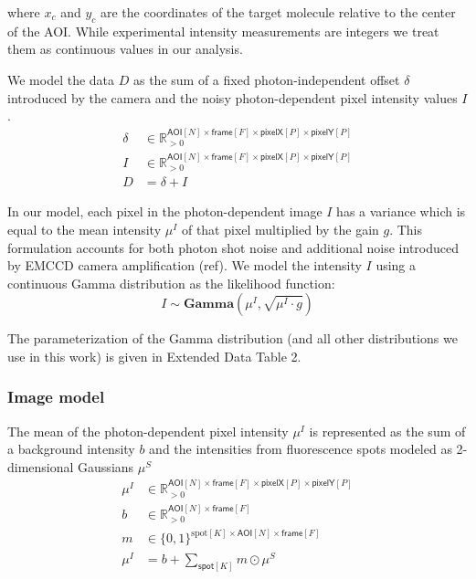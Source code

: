 \noindent
where $x_c$ and $y_c$ are the coordinates of the target molecule relative to the center of the AOI. While experimental intensity measurements are integers we treat them as continuous values in our analysis.

We model the data $D$ as the sum of a fixed photon-independent offset $\delta$ introduced by the camera and the noisy photon-dependent pixel intensity values $I$.
%
\begin{subequations}
\begin{align}
    \delta &\in \mathbb{R}_{>0}^{\mathsf{AOI}[N] \times \mathsf{frame}[F] \times \mathsf{pixelX}[P] \times \mathsf{pixelY}[P]} \\
    I &\in \mathbb{R}_{>0}^{\mathsf{AOI}[N] \times \mathsf{frame}[F] \times \mathsf{pixelX}[P] \times \mathsf{pixelY}[P]} \\ 
    D &= \delta + I
\end{align}
\end{subequations}

In our model, each pixel in the photon-dependent image $I$ has a  variance which is equal to  the mean intensity $\mu^I$ of that pixel multiplied by the gain $g$. This formulation accounts for both photon shot noise and additional noise introduced by EMCCD camera amplification (ref). We model the intensity $I$ using a continuous Gamma distribution as the likelihood function:
%
\begin{equation}
    I \sim \mathbf{Gamma} (\mu^I, \sqrt{\mu^I \cdot g})
\end{equation}

The parameterization of the Gamma distribution (and all other distributions we use in this work) is given in Extended Data Table 2.

\subsubsection*{Image model}

The mean of the photon-dependent pixel intensity $\mu^I$ is represented  as the sum of a background intensity $b$ and the intensities from fluorescence spots modeled as  2-dimensional Gaussians $\mu^S$ 
%
\begin{subequations}
\begin{align}
    \mu^I &\in \mathbb{R}_{>0}^{\mathsf{AOI}[N] \times \mathsf{frame}[F] \times \mathsf{pixelX}[P] \times \mathsf{pixelY}[P]} \\
    b &\in \mathbb{R}_{>0}^{\mathsf{AOI}[N] \times \mathsf{frame}[F]} \\
    m &\in \{ 0, 1 \}^{\mathrm{spot}[K] \times \mathsf{AOI}[N] \times \mathsf{frame}[F] } \\
    \mu^I &= b + \sum_{\mathsf{spot}[K]} m \odot{} \mu^S
\end{align}
\end{subequations}

